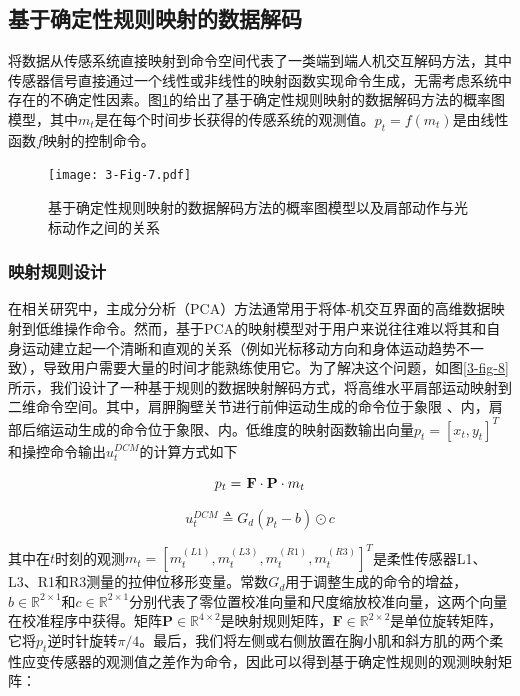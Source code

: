 \subsection{基于确定性规则映射的数据解码}
将数据从传感系统直接映射到命令空间代表了一类端到端人机交互解码方法，其中传感器信号直接通过一个线性或非线性的映射函数实现命令生成，无需考虑系统中存在的不确定性因素。图\ref{3-fig-7}的给出了基于确定性规则映射的数据解码方法的概率图模型，其中${m_t}$是在每个时间步长获得的传感系统的观测值。${{p}_t} = f({{m}_t})$是由线性函数$f$映射的控制命令。

\begin{figure}[htb]
    \centering
    \texttt{[image: 3-Fig-7.pdf]}
    \caption{基于确定性规则映射的数据解码方法的概率图模型以及肩部动作与光标动作之间的关系}
    \label{3-fig-7}
\end{figure} 

\subsubsection{映射规则设计}
在相关研究中，主成分分析（PCA）方法通常用于将体-机交互界面的高维数据映射到低维操作命令\cite{casadioBodyMachineInterface2011,seanez-gonzalezStaticDynamicDecoding2017}。然而，基于PCA的映射模型对于用户来说往往难以将其和自身运动建立起一个清晰和直观的关系（例如光标移动方向和身体运动趋势不一致），导致用户需要大量的时间才能熟练使用它。为了解决这个问题，如图\ref{3-fig-8}所示，我们设计了一种基于规则的数据映射解码方式，将高维水平肩部运动映射到二维命令空间。其中，肩胛胸壁关节进行前伸运动生成的命令位于象限 \uppercase\expandafter{}、\uppercase\expandafter{}内，肩部后缩运动生成的命令位于象限\uppercase\expandafter{}、\uppercase\expandafter{}内。低维度的映射函数输出向量${p_t} = {[{x_t},{y_t}]^T}$和操控命令输出$u_t^{DCM}$的计算方式如下

\begin{equation}
{p_t} = {\kern 1pt} \mathbf{{F}} \cdot \mathbf{{P}} \cdot {m_t}
\label{eq1}
\end{equation}   

\begin{equation}
\label{eq2}
u_t^{DCM} \triangleq {G_d}\left( {{p_t} - b} \right) \odot c
\end{equation}   

其中在$t$时刻的观测${m_t} = {[m_t^{(L1)},m_t^{(L3)},m_t^{(R1)},m_t^{(R3)}]^T}$是柔性传感器L1、L3、R1和R3测量的拉伸位移形变量。常数${G_d}$用于调整生成的命令的增益，$b\in {\mathbb{R}^{2 \times 1}}$和$c \in {\mathbb{R}^{2 \times 1}}$分别代表了零位置校准向量和尺度缩放校准向量，这两个向量在校准程序中获得。矩阵$\mathbf{P} \in {\mathbb{R}^{4 \times 2}}$是映射规则矩阵，$\mathbf{F} \in {\mathbb{R}^{2 \times 2}}$是单位旋转矩阵，它将$p_t$逆时针旋转$\pi /4$。最后，我们将左侧或右侧放置在胸小肌和斜方肌的两个柔性应变传感器的观测值之差作为命令，因此可以得到基于确定性规则的观测映射矩阵：

